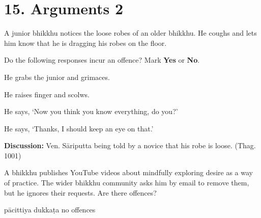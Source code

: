 \chapter{15. Arguments 2}
\renewcommand*{\theChapterTitle}{15. Arguments 2}

\begin{exam}{\autoExamName}

  \begin{problem*}

    A junior bhikkhu notices the loose robes of an older bhikkhu.
    He coughs and lets him know that he is dragging his robes on the floor.

    \bigskip

    Do the following responses incur an offence? Mark \textbf{Yes} or \textbf{No}.

    \bigskip

      \begin{parts}

      \item {} He grabs the junior and grimaces.
      \item {} He raises finger and scolws.
      \item {} He says, `Now you think you know everything, do you?'
      \item {} He says, `Thanks, I should keep an eye on that.'

      \end{parts}

    \bigskip

    \textbf{Discussion:} Ven. Sāriputta being told by a novice that his robe is loose. (Thag. 1001)
    
  \end{problem*}

  \problemDivide

  \begin{problem}

  A bhikkhu publishes YouTube videos about mindfully exploring desire as a way
  of practice. The wider bhikkhu community asks him by email to remove them, but
  he ignores their requests. Are there offences?

  \bigskip

  \begin{answers}{3}
    \bChoices
     pācittiya\eAns
     dukkaṭa\eAns
     no offences\eAns
    \eChoices
  \end{answers}

  \bigskip


\end{problem}
\end{exam}
